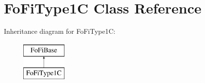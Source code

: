 \hypertarget{class_fo_fi_type1_c}{}\section{Fo\+Fi\+Type1C Class Reference}
\label{class_fo_fi_type1_c}
Inheritance diagram for Fo\+Fi\+Type1C\+:\begin{figure}[H]
\begin{center}
\leavevmode
\includegraphics[height=2.000000cm]{class_fo_fi_type1_c}
\end{center}
\end{figure}
